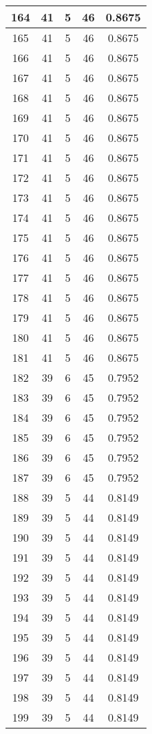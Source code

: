 \documentclass[letterpaper, 12pt]{article}
\begin{document}
\begin{longtable}{|c|c|c|c|c|}
\hline
164 & 41 & 5 & 46 & 0.8675 \\
\hline
165 & 41 & 5 & 46 & 0.8675 \\
\hline
166 & 41 & 5 & 46 & 0.8675 \\
\hline
167 & 41 & 5 & 46 & 0.8675 \\
\hline
168 & 41 & 5 & 46 & 0.8675 \\
\hline
169 & 41 & 5 & 46 & 0.8675 \\
\hline
170 & 41 & 5 & 46 & 0.8675 \\
\hline
171 & 41 & 5 & 46 & 0.8675 \\
\hline
172 & 41 & 5 & 46 & 0.8675 \\
\hline
173 & 41 & 5 & 46 & 0.8675 \\
\hline
174 & 41 & 5 & 46 & 0.8675 \\
\hline
175 & 41 & 5 & 46 & 0.8675 \\
\hline
176 & 41 & 5 & 46 & 0.8675 \\
\hline
177 & 41 & 5 & 46 & 0.8675 \\
\hline
178 & 41 & 5 & 46 & 0.8675 \\
\hline
179 & 41 & 5 & 46 & 0.8675 \\
\hline
180 & 41 & 5 & 46 & 0.8675 \\
\hline
181 & 41 & 5 & 46 & 0.8675 \\
\hline
182 & 39 & 6 & 45 & 0.7952 \\
\hline
183 & 39 & 6 & 45 & 0.7952 \\
\hline
184 & 39 & 6 & 45 & 0.7952 \\
\hline
185 & 39 & 6 & 45 & 0.7952 \\
\hline
186 & 39 & 6 & 45 & 0.7952 \\
\hline
187 & 39 & 6 & 45 & 0.7952 \\
\hline
188 & 39 & 5 & 44 & 0.8149 \\
\hline
189 & 39 & 5 & 44 & 0.8149 \\
\hline
190 & 39 & 5 & 44 & 0.8149 \\
\hline
191 & 39 & 5 & 44 & 0.8149 \\
\hline
192 & 39 & 5 & 44 & 0.8149 \\
\hline
193 & 39 & 5 & 44 & 0.8149 \\
\hline
194 & 39 & 5 & 44 & 0.8149 \\
\hline
195 & 39 & 5 & 44 & 0.8149 \\
\hline
196 & 39 & 5 & 44 & 0.8149 \\
\hline
197 & 39 & 5 & 44 & 0.8149 \\
\hline
198 & 39 & 5 & 44 & 0.8149 \\
\hline
199 & 39 & 5 & 44 & 0.8149 \\
\hline
\end{longtable}
\end{document}
